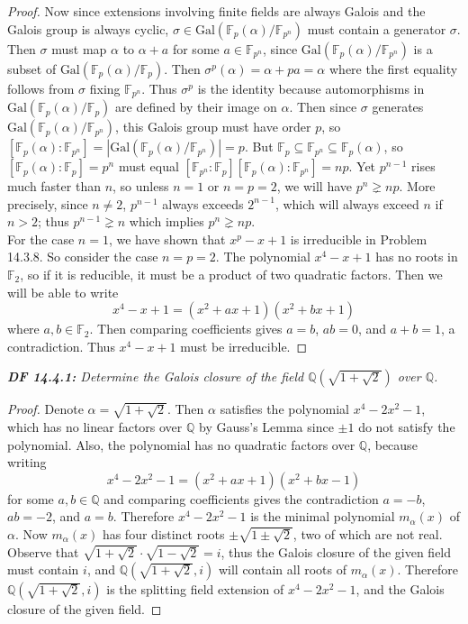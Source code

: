 \documentclass{article}
\begin{document}
\begin{proof}
    Now since extensions involving finite fields are always Galois and the
    Galois group is always cyclic,
    $\sigma\in\text{Gal}(\mathbb{F}_p(\alpha)/\mathbb{F}_{p^n})$ must
    contain a generator $\sigma$. Then $\sigma$ must map
    $\alpha$ to $\alpha+a$ for some $a\in\mathbb{F}_{p^n}$, since
    $\text{Gal}(\mathbb{F}_p(\alpha)/\mathbb{F}_{p^n})$ is a subset of
    $\text{Gal}(\mathbb{F}_p(\alpha)/\mathbb{F}_{p})$. Then
    $\sigma^p(\alpha)=\alpha+pa=\alpha$ where the first equality follows
    from $\sigma$ fixing $\mathbb{F}_{p^n}$. Thus $\sigma^p$ is the
    identity because automorphisms in
    $\text{Gal}(\mathbb{F}_p(\alpha)/\mathbb{F}_p)$ are defined by their
    image on $\alpha$. Then since $\sigma$ generates
    $\text{Gal}(\mathbb{F}_p(\alpha)/\mathbb{F}_{p^n})$, this Galois group
    must have order $p$, so $[\mathbb{F}_p(\alpha):\mathbb{F}_{p^n}]
    =|\text{Gal}(\mathbb{F}_p(\alpha)/\mathbb{F}_{p^n})|=p$. But
    $\mathbb{F}_p\subseteq\mathbb{F}_{p^n}\subseteq\mathbb{F}_p(\alpha)$,
    so $[\mathbb{F}_{p}(\alpha):\mathbb{F}_p]=p^n$ must equal
    $[\mathbb{F}_{p^n}:\mathbb{F}_p]
    [\mathbb{F}_{p}(\alpha):\mathbb{F}_{p^n}]=np$. Yet $p^{n-1}$ rises much
    faster than $n$, so unless $n=1$ or
    $n=p=2$, we will have $p^n\gneq np$. More precisely, since $n\neq2$,
    $p^{n-1}$ always exceeds $2^{n-1}$, which will always exceed $n$ if
    $n>2$; thus $p^{n-1}\gneq n$ which implies $p^n\gneq np$. \\

    For the case $n=1$, we have shown that $x^p-x+1$ is irreducible in
    Problem 14.3.8. So consider the case $n=p=2$. The polynomial $x^4-x+1$
    has no roots in $\mathbb{F}_2$, so if it is reducible, it must be a
    product of two quadratic factors. Then we will be able to write
    \[x^4-x+1 =(x^2+ax+1)(x^2+bx+1)\]
    where $a,b\in\mathbb{F}_2$. Then comparing coefficients gives
    $a=b$, $ab=0$, and $a+b=1$, a contradiction. Thus $x^4-x+1$ must be
    irreducible.
  \end{proof}

\it \textbf{DF 14.4.1:} Determine the Galois closure of the field
  $\mathbb{Q}(\sqrt{1+\sqrt{2}})$ over $\mathbb{Q}$.

  \begin{proof}
    Denote $\alpha=\sqrt{1+\sqrt{2}}$. Then $\alpha$ satisfies the
    polynomial $x^4-2x^2-1$, which has no linear factors over $\mathbb{Q}$
    by Gauss's Lemma since $\pm1$ do not satisfy the polynomial. Also, the
    polynomial has no quadratic factors over $\mathbb{Q}$, because writing
    \[x^4-2x^2-1 =(x^2+ax+1)(x^2+bx-1)\]
    for some $a,b\in\mathbb{Q}$ and comparing coefficients gives the
    contradiction $a=-b$, $ab=-2$, and $a=b$. Therefore $x^4-2x^2-1$ is the
    minimal polynomial $m_\alpha(x)$ of $\alpha$. Now $m_\alpha(x)$ has
    four distinct roots $\pm\sqrt{1\pm\sqrt{2}}$, two of which are not
    real. Observe that $\sqrt{1+\sqrt{2}} \cdot\sqrt{1-\sqrt{2}}=i$,
    thus the Galois closure of the given field must contain $i$, and
    $\mathbb{Q}(\sqrt{1+\sqrt{2}},i)$ will contain all roots of
    $m_\alpha(x)$. Therefore $\mathbb{Q}(\sqrt{1+\sqrt{2}},i)$ is the
    splitting field extension of $x^4-2x^2-1$, and the Galois closure
    of the given field.
  \end{proof}
\end{document}
